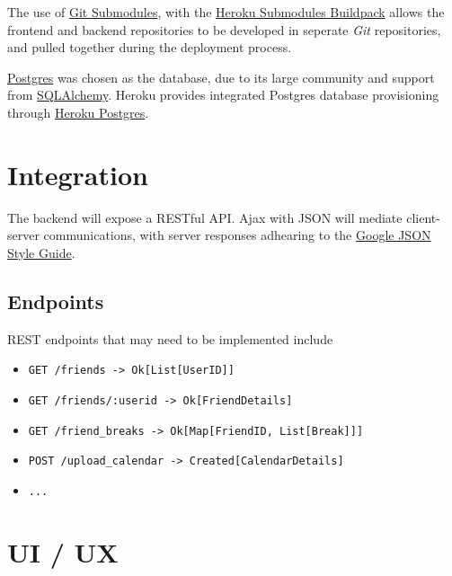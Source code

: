 \documentclass[8pt,a4paper]{report}
\begin{document}
The use of \href{https://git-scm.com/book/en/v2/Git-Tools-Submodules}{Git Submodules}, with the \href{https://github.com/dmathieu/heroku-buildpack-submodules}{Heroku Submodules Buildpack} allows the frontend and backend repositories to be developed in seperate \textit{Git} repositories, and pulled together during the deployment process.

\href{https://www.postgresql.org/}{Postgres} was chosen as the database, due to its large community and support from \href{https://www.sqlalchemy.org/}{SQLAlchemy}. Heroku provides integrated Postgres database provisioning through \href{https://www.heroku.com/postgres}{Heroku Postgres}.

\section{Integration}

The backend will expose a RESTful API. Ajax with JSON will mediate client-server communications, with server responses adhearing to the \href{https://google.github.io/styleguide/jsoncstyleguide.xml}{Google JSON Style Guide}.

\subsection{Endpoints}

REST endpoints that may need to be implemented include

\begin{itemize}
    \item \texttt{GET /friends -> Ok[List[UserID]]}
    \item \texttt{GET /friends/:userid -> Ok[FriendDetails]}
    \item \texttt{GET /friend\_breaks -> Ok[Map[FriendID, List[Break]]]}
    \item \texttt{POST /upload\_calendar -> Created[CalendarDetails]}
    \item \texttt{...}
\end{itemize}


\section{UI / UX}
\end{document}
